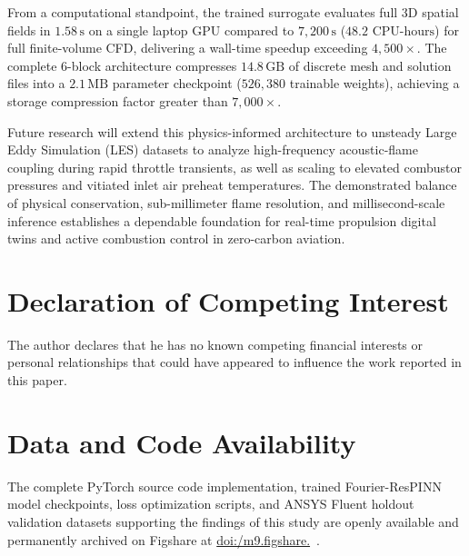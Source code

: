 \documentclass[reprint,aps,prfluids,superscriptaddress,twocolumn,floatfix]{revtex4-2}
\begin{document}
From a computational standpoint, the trained surrogate evaluates full 3D spatial fields in $1.58\,\text{s}$ on a single laptop GPU compared to $7,200\,\text{s}$ ($48.2\text{ CPU-hours}$) for full finite-volume CFD, delivering a wall-time speedup exceeding $4,500\times$. The complete 6-block architecture compresses $14.8\,\text{GB}$ of discrete mesh and solution files into a $2.1\,\text{MB}$ parameter checkpoint ($526,380$ trainable weights), achieving a storage compression factor greater than $7,000\times$.

Future research will extend this physics-informed architecture to unsteady Large Eddy Simulation (LES) datasets to analyze high-frequency acoustic-flame coupling during rapid throttle transients, as well as scaling to elevated combustor pressures and vitiated inlet air preheat temperatures. The demonstrated balance of physical conservation, sub-millimeter flame resolution, and millisecond-scale inference establishes a dependable foundation for real-time propulsion digital twins and active combustion control in zero-carbon aviation.

\section*{Declaration of Competing Interest}
The author declares that he has no known competing financial interests or personal relationships that could have appeared to influence the work reported in this paper.

\section*{Data and Code Availability}
The complete PyTorch source code implementation, trained Fourier-ResPINN model checkpoints, loss optimization scripts, and ANSYS Fluent holdout validation datasets supporting the findings of this study are openly available and permanently archived on Figshare at \href{https://doi.org/10.6084/m9.figshare.33986668}{doi:/\allowbreak m9.\allowbreak figshare.}~\cite{kamble2026dataset}.
\end{document}
